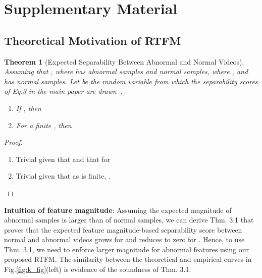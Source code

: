 \documentclass[10pt,twocolumn,letterpaper]{article}
\newtheorem{theorem}{Theorem}[section]
\newcommand{\beginsupplement}{\setcounter{table}{0}
        \renewcommand{\thetable}{S\arabic{table}}\setcounter{figure}{0}
        \renewcommand{\thesection}{\Alph{section}}
     }
\begin{document}
{\small


}

\newpage

\beginsupplement
\setcounter{section}{0}

\setcounter{equation}{0}
\setcounter{figure}{0}
\setcounter{table}{0}
\setcounter{page}{1}
\makeatletter
\renewcommand{\theequation}{S\arabic{equation}}
\renewcommand{\thefigure}{S\arabic{figure}}
\newpage
\section{Supplementary Material}
\subsection{Theoretical Motivation of RTFM}

\begin{theorem}[Expected Separability Between Abnormal and Normal Videos]
\label{thm:expected_separability}
Assuming that , where  has  abnormal samples and  normal samples, where , and  has  normal samples.
Let  be the random variable from which the separability scores  of Eq.3 in the main paper are drawn~\cite{li2015multiple}.
\begin{enumerate}
    \item If  , then
    
    \item For a finite , then
    
\end{enumerate}
\end{theorem}
\begin{proof}


\begin{enumerate}
\item Trivial given that
 and that  for 
\item Trivial given that as  is finite, .
\end{enumerate}
\end{proof}


\textbf{Intuition of feature magnitude}: Assuming the expected magnitude of abnormal samples is larger than of normal samples, we can derive Thm. 3.1 that proves that the expected feature magnitude-based separability score between normal and abnormal videos grows for  and reduces to zero for . Hence, to use Thm. 3.1, we need to enforce larger magnitude for abnormal features using our proposed RTFM. The similarity between the theoretical and empirical curves in Fig.\ref{fig:k_fig}(left) is evidence of the soundness of Thm. 3.1.
\end{document}
